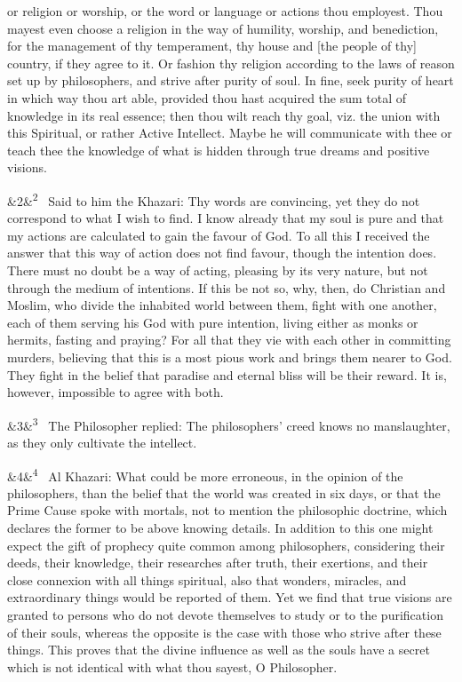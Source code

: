 \documentclass[12pt]{article}
\newcommand{\para}[1][]{\par\noindent\ifx&#1&\else\textsuperscript{\footnotesize #1}~\fi}
\begin{document}
or religion or worship, or the word or language or actions thou employest. Thou mayest even choose a religion in the way of humility, worship, and benediction, for the management of thy temperament, thy house and [the people of thy] country, if they agree to it. Or fashion thy religion according to the laws of reason set up by philosophers, and strive after purity of soul. In fine, seek purity of heart in which way thou art able, provided thou hast acquired the sum total of knowledge in its real essence; then thou wilt reach thy goal, viz. the union with this Spiritual, or rather Active Intellect. Maybe he will communicate with thee or teach thee the knowledge of what is hidden through true dreams and positive visions.

\para[2] Said to him the Khazari: Thy words are convincing, yet they do not correspond to what I wish to find. I know already that my soul is pure and that my actions are calculated to gain the favour of God. To all this I received the answer that this way of action does not find favour, though the intention does. There must no doubt be a way of acting, pleasing by its very nature, but not through the medium of intentions. If this be not so, why, then, do Christian and Moslim, who divide the inhabited world between them, fight with one another, each of them serving his God with pure intention, living either as monks or hermits, fasting and praying? For all that they vie with each other in committing murders, believing that this is a most pious work and brings them nearer to God. They fight in the belief that paradise and eternal bliss will be their reward. It is, however, impossible to agree with both.

\para[3] The Philosopher replied: The philosophers' creed knows no manslaughter, as they only cultivate the intellect.

\para[4] Al Khazari: What could be more erroneous, in the opinion of the philosophers, than the belief that the world was created in six days, or that the Prime Cause spoke with mortals, not to mention the philosophic doctrine, which declares the former to be above knowing details. In addition to this one might expect the gift of prophecy quite common among philosophers, considering their deeds, their knowledge, their researches after truth, their exertions, and their close connexion with all things spiritual, also that wonders, miracles, and extraordinary things would be reported of them. Yet we find that true visions are granted to persons who do not devote themselves to study or to the purification of their souls, whereas the opposite is the case with those who strive after these things. This proves that the divine influence as well as the souls have a secret which is not identical with what thou sayest, O Philosopher.
\end{document}
